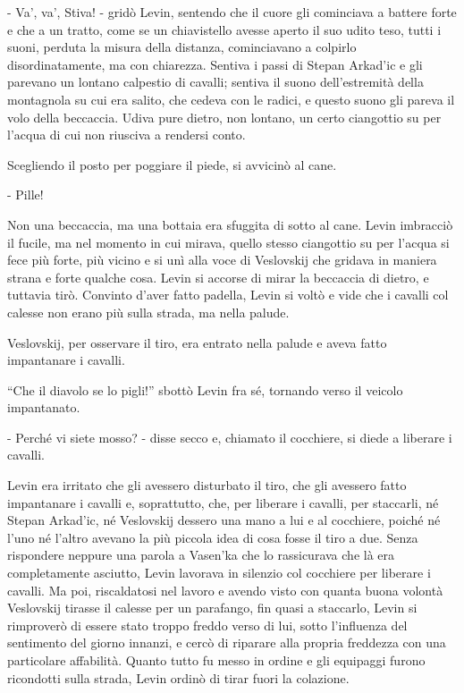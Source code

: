 - Va', va', Stiva! - gridò Levin, sentendo che il cuore gli cominciava a battere forte e che a un tratto, come se un chiavistello avesse aperto il suo udito teso, tutti i suoni, perduta la misura della distanza, cominciavano a colpirlo disordinatamente, ma con chiarezza. Sentiva i passi di Stepan Arkad'ic e gli parevano un lontano calpestio di cavalli; sentiva il suono dell'estremità della montagnola su cui era salito, che cedeva con le radici, e questo suono gli pareva il volo della beccaccia. Udiva pure dietro, non lontano, un certo ciangottio su per l'acqua di cui non riusciva a rendersi conto. 

Scegliendo il posto per poggiare il piede, si avvicinò al cane. 

- Pille! 

Non una beccaccia, ma una bottaia era sfuggita di sotto al cane. Levin imbracciò il fucile, ma nel momento in cui mirava, quello stesso ciangottio su per l'acqua si fece più forte, più vicino e si unì alla voce di Veslovskij che gridava in maniera strana e forte qualche cosa. Levin si accorse di mirar la beccaccia di dietro, e tuttavia tirò. Convinto d'aver fatto padella, Levin si voltò e vide che i cavalli col calesse non erano più sulla strada, ma nella palude. 

Veslovskij, per osservare il tiro, era entrato nella palude e aveva fatto impantanare i cavalli. 

``Che il diavolo se lo pigli!'' sbottò Levin fra sé, tornando verso il veicolo impantanato. 

- Perché vi siete mosso? - disse secco e, chiamato il cocchiere, si diede a liberare i cavalli. 

Levin era irritato che gli avessero disturbato il tiro, che gli avessero fatto impantanare i cavalli e, soprattutto, che, per liberare i cavalli, per staccarli, né Stepan Arkad'ic, né Veslovskij dessero una mano a lui e al cocchiere, poiché né l'uno né l'altro avevano la più piccola idea di cosa fosse il tiro a due. Senza rispondere neppure una parola a Vasen'ka che lo rassicurava che là era completamente asciutto, Levin lavorava in silenzio col cocchiere per liberare i cavalli. Ma poi, riscaldatosi nel lavoro e avendo visto con quanta buona volontà Veslovskij tirasse il calesse per un parafango, fin quasi a staccarlo, Levin si rimproverò di essere stato troppo freddo verso di lui, sotto l'influenza del sentimento del giorno innanzi, e cercò di riparare alla propria freddezza con una particolare affabilità. Quanto tutto fu messo in ordine e gli equipaggi furono ricondotti sulla strada, Levin ordinò di tirar fuori la colazione. 


